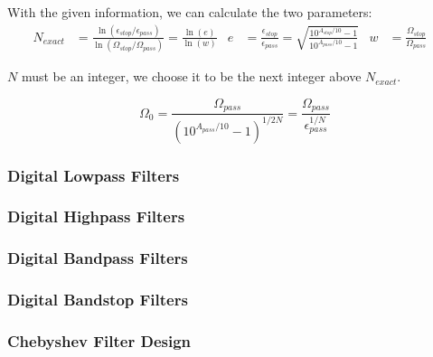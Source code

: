 With the given information, we can calculate the two parameters:
\begin{align*}
	N_{exact} &= \frac{
			\ln(\epsilon_{stop} / \epsilon_{pass})
		}{
			\ln(\Omega_{stop} / \Omega_{pass})
		}
	= \frac{\ln(e)}{\ln(w)} &	
	e &= \frac{\epsilon_{stop}}{\epsilon_{pass}}
	   = \sqrt{\frac{10^{A_{stop}/10} -1}{10^{A_{pass}/10} -1}}&
	w &= \frac{\Omega_{stop}}{\Omega_{pass}}&	
\end{align*}

$N$ must be an integer, we choose it to be the next integer above $N_{exact}$.

\[
	\Omega_0 = \frac{
			\Omega_{pass}
		}{
			\left(10^{A_{pass}/10}-1\right)^{1/2N}
		} = \frac{
			\Omega_{pass}
		}{
			\epsilon_{pass}^{1/N}
		}
\]

\subsubsection{Digital Lowpass Filters}
\subsubsection{Digital Highpass Filters}
\subsubsection{Digital Bandpass Filters}
\subsubsection{Digital Bandstop Filters}
\subsubsection{Chebyshev Filter Design}
